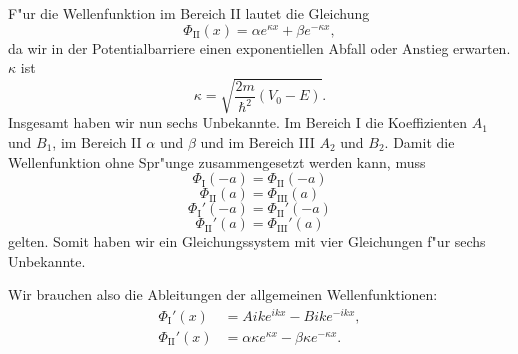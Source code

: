 \begin{refsection}
F"ur die Wellenfunktion im Bereich \textrm{II} lautet die Gleichung
\[
\Phi_\text{II}(x) = \alpha e^{\kappa x} + \beta e^{-\kappa x},
\]
da wir in der Potentialbarriere einen exponentiellen Abfall oder Anstieg erwarten. 
$\kappa$ ist
\[
\kappa = \sqrt{\frac{2m}{\hbar^2}(V_0 - E)}.
\]
Insgesamt haben wir nun sechs Unbekannte. 
Im Bereich \textrm{I} die Koeffizienten $A_1$ und $B_1$, im Bereich \textrm{II} $\alpha$ und $\beta$ und im Bereich \textrm{III} $A_2$ und $B_2$. 
Damit die Wellenfunktion ohne Spr"unge zusammengesetzt werden kann, muss
\begin{equation}
\Phi_\text{I}(-a) = \Phi_\text{II}(-a)
\label{tunnel:fktwert-a}
\end{equation}
\begin{equation}
\Phi_\text{II}(a) = \Phi_\text{III}(a)
\label{tunnel:fktwerta}
\end{equation}
\begin{equation}
\Phi_\text{I}'(-a) = \Phi_\text{II}'(-a)
\label{tunnel:steigung-a}
\end{equation}
\begin{equation}
\Phi_\text{II}'(a) = \Phi_\text{III}'(a)
\label{tunnel:steigunga}
\end{equation}
gelten.
Somit haben wir ein Gleichungssystem mit vier Gleichungen f"ur sechs Unbekannte.

Wir brauchen also die Ableitungen der allgemeinen Wellenfunktionen:
\begin{align*}
\Phi_\text{I}'(x) &= Aike^{ikx} - Bike^{-ikx},
\\
\Phi_\text{II}'(x) &= \alpha \kappa e^{\kappa x} - \beta \kappa e^{-\kappa x}.
\end{align*}


\end{refsection}
